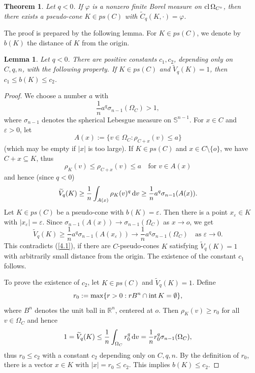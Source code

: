 \documentclass[12pt]{article}
\newcommand{\0}{\mbox{\boldmath$o$}}
\newcommand{\Sn}{{\mathbb S}^{n-1}}
\newcommand{\R}{{\mathbb R}}
\newcommand{\D}{{\rm d}}
\newtheorem{theorem}{Theorem}%
\newtheorem{lemma}{Lemma}%
\begin{document}
\begin{theorem}\label{T4.1}
Let $q<0$. If $\varphi$ is a nonzero finite Borel measure on ${\rm cl}\,\Omega_{C^\circ}$, then there exists a pseudo-cone $K\in ps(C)$ with $\widetilde C_q(K,\cdot)=\varphi$.
\end{theorem}

The proof is prepared by the following lemma. For $K\in ps(C)$, we denote by $b(K)$ the distance of $K$ from the origin.

\begin{lemma}\label{L4.1}
Let $q<0$. There are positive constants $c_1,c_2$, depending only on $C,q,n$, with the following property. If $K\in ps(C)$ and $\widetilde V_q(K)=1$, then $c_1\le b(K)\le c_2$.
\end{lemma}

\begin{proof}
We choose a number $a$ with
\begin{equation}\label{4.1}
\frac{1}{n}a^q\sigma_{n-1}(\Omega_C)>1,
\end{equation}
where $\sigma_{n-1}$ denotes the spherical Lebesgue measure on $\Sn$. For $x\in C$ and $\varepsilon>0$, let 
$$ A(x):=\{v\in\Omega_C:\rho_{C+x}(v)\le a\}$$ 
(which may be empty if $|x|$ is too large). If $K\in ps(C)$ and $x\in C\setminus\{o\}$, we have $C+x\subseteq K$, thus
$$ \rho_K(v)\le \rho_{C+x}(v)\le a\quad\mbox{for } v\in A(x)$$
and hence (since $q<0$)
$$ \widetilde V_q(K) \ge \frac{1}{n} \int_{A(x)} \rho_K(v)^q\,\D v\ge\frac{1}{n} a^q\sigma_{n-1}(A(x)).$$
Let $K\in ps(C)$ be a pseudo-cone with $b(K)=\varepsilon$. Then there is a point $x_\varepsilon\in K$ with $|x_\varepsilon|=\varepsilon$. Since $\sigma_{n-1}(A(x))\to \sigma_{n-1}(\Omega_C)$ as $x\to o$, we get
$$ \widetilde V_q(K)\ge \frac{1}{n}a^q\sigma_{n-1}(A(x_\varepsilon))\to \frac{1}{n}a^q\sigma_{n-1}(\Omega_C) \quad\mbox{as } \varepsilon \to 0.$$
This contradicts (\ref{4.1}), if there are $C$-pseudo-cones $K$ satisfying $\widetilde V_q(K)=1$ with arbitrarily small distance from the origin. The existence of the constant $c_1$ follows.

To prove the existence of $c_2$, let $K\in ps(C)$ and $\widetilde V_q(K)=1$. Define
$$ r_0:= \max\{r>0: rB^n\cap{\rm int}\,K=\emptyset\},$$
where $B^n$ denotes the unit ball in $\R^n$, centered at $o$. Then $\rho_K(v)\ge r_0$ for all $v\in\Omega_C$ and hence
$$ 1= \widetilde V_q(K) \le \frac{1}{n}\int_{\Omega_C} r_0^q\,\D v =\frac{1}{n} r_0^q\sigma_{n-1}(\Omega_C),$$
thus $r_0\le c_2$ with a constant $c_2$ depending only on $C,q,n$. By the definition of $r_0$, there is a vector $x\in K$ with $|x|=r_0\le c_2$. This implies $b(K)\le c_2$.
\end{proof}
\end{document}
